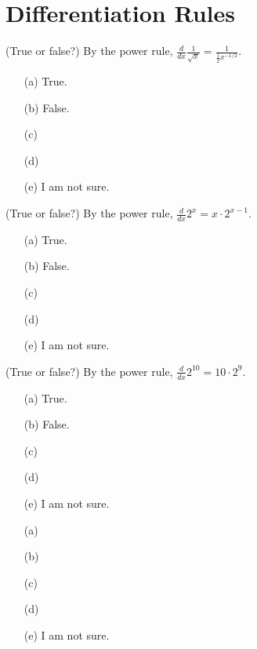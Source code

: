\documentclass[14pt]{beamer}
\begin{document}
\section{Differentiation Rules}
\begin{frame}
  (True or false?) By the power rule, \(\frac{d}{dx} \frac{1}{\sqrt{x}} = \frac{1}{\frac{1}{2}x^{-1/2}}\).

  \medskip
  \begin{itemize} \setlength\itemsep{2ex}
    \item[(a)] True.
    \item[(b)] False.
    \item[(c)] 
    \item[(d)] 
    \item[(e)] I am not sure.
  \end{itemize} 
\end{frame}


\begin{frame}
  (True or false?) By the power rule, \(\frac{d}{dx} 2^{x} = x \cdot 2^{x-1}\).

  \medskip
  \begin{itemize} \setlength\itemsep{2ex}
    \item[(a)] True.
    \item[(b)] False.
    \item[(c)] 
    \item[(d)] 
    \item[(e)] I am not sure.
  \end{itemize} 
\end{frame}


\begin{frame}
  (True or false?) By the power rule, \(\frac{d}{dx} 2^{10} = 10 \cdot 2^{9}\).

  \medskip
  \begin{itemize} \setlength\itemsep{2ex}
    \item[(a)] True.
    \item[(b)] False.
    \item[(c)] 
    \item[(d)] 
    \item[(e)] I am not sure.
  \end{itemize} 
\end{frame}


\begin{frame}

  \medskip
  \begin{itemize} \setlength\itemsep{2ex}
    \item[(a)] 
    \item[(b)] 
    \item[(c)] 
    \item[(d)] 
    \item[(e)] I am not sure.
  \end{itemize} 
\end{frame}
\end{document}

